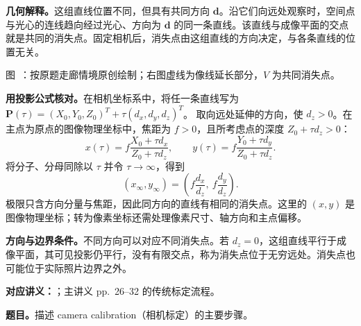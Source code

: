 \begin{checkedsolution}
\nopagebreak[4]
\textbf{几何解释。}这组直线位置不同，但具有共同方向 $\bm d$。沿它们向远处观察时，空间点与光心的连线趋向经过光心、方向为 $\bm d$ 的同一条直线。该直线与成像平面的交点就是共同的消失点。固定相机后，消失点由这组直线的方向决定，与各条直线的位置无关。

\begin{center}
  
  \par\smallskip
  \label{fig:sc4061-tut07-vanishing}
  {\small 图~\thefigure：按原题走廊情境原创绘制；右图虚线为像线延长部分，$V$ 为共同消失点。}
\end{center}

\textbf{用投影公式核对。}在相机坐标系中，将任一条直线写为 $\bm P(\tau)=(X_0,Y_0,Z_0)^T+\tau(d_x,d_y,d_z)^T$。
取向远处延伸的方向，使 $d_z>0$。在主点为原点的图像物理坐标中，焦距为 $f>0$，且所考虑点的深度 $Z_0+\tau d_z>0$：
\[
  x(\tau)=f\frac{X_0+\tau d_x}{Z_0+\tau d_z},\qquad
  y(\tau)=f\frac{Y_0+\tau d_y}{Z_0+\tau d_z}.
\]
将分子、分母同除以 $\tau$ 并令 $\tau\to\infty$，得到
\[
  \boxed{(x_\infty,y_\infty)
    =\left(f\frac{d_x}{d_z},\ f\frac{d_y}{d_z}\right)}.
\]
极限只含方向分量与焦距，因此同方向的直线有相同的消失点。这里的 $(x,y)$ 是图像物理坐标；转为像素坐标还需处理像素尺寸、轴方向和主点偏移。

\textbf{方向与边界条件。}不同方向可以对应不同消失点。若 $d_z=0$，这组直线平行于成像平面，其可见投影仍平行，没有有限交点，称为消失点位于无穷远处。消失点也可能位于实际照片边界之外。
\end{checkedsolution}


\textbf{对应讲义：}；主讲义 pp.~26--32 的传统标定流程。

\textbf{题目。}描述 camera calibration（相机标定）的主要步骤。

